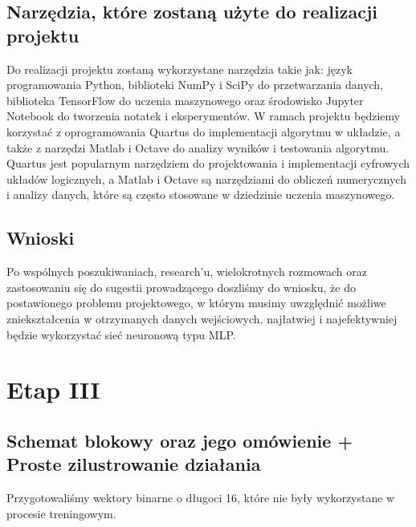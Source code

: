 \documentclass[a4paper, titleauthor]{mwart}
\begin{document}
\subsection{Narzędzia, które zostaną użyte do realizacji projektu}
Do realizacji projektu zostaną wykorzystane narzędzia takie jak: język programowania Python, biblioteki NumPy i SciPy do przetwarzania danych, biblioteka TensorFlow do uczenia maszynowego oraz środowisko Jupyter Notebook do tworzenia notatek i eksperymentów. 
W ramach projektu będziemy korzystać z oprogramowania Quartus do implementacji algorytmu w układzie, a także z narzędzi Matlab i Octave do analizy wyników i testowania algorytmu. Quartus jest popularnym narzędziem do projektowania i implementacji cyfrowych układów logicznych, a Matlab i Octave są narzędziami do obliczeń numerycznych i analizy danych, które są często stosowane w dziedzinie uczenia maszynowego.
\subsection{Wnioski}
Po wspólnych poszukiwaniach, research'u, wielokrotnych rozmowach oraz  zastosowaniu się do sugestii prowadzącego doszliśmy do wniosku, że do postawionego problemu projektowego, w którym musimy uwzględnić możliwe zniekształcenia w otrzymanych danych wejściowych, najłatwiej i najefektywniej będzie wykorzystać sieć neuronową typu MLP. 

\newpage
\section{\large Etap III}
\subsection{Schemat blokowy oraz jego omówienie + Proste zilustrowanie działania}


Przygotowaliśmy wektory binarne o długoci 16, które nie były wykorzystane w procesie treningowym.
\end{document}
